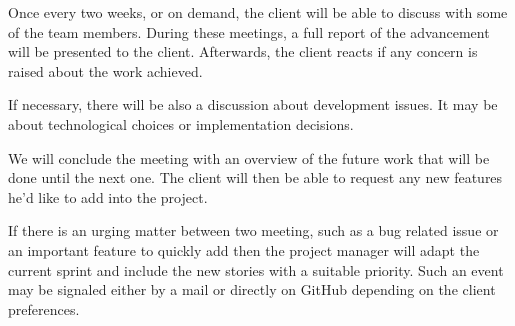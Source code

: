 \documentclass[11pt,a4paper]{article}
\begin{document}
Once every two weeks, or on demand, the client will be able to discuss
with some of the team members. During these meetings, a full report of
the advancement will be presented to the client. Afterwards, the
client reacts if any concern is raised about the work achieved.

If necessary, there will be also a discussion about development
issues. It may be about technological choices or implementation
decisions.

We will conclude the meeting with an overview of the future work that
will be done until the next one. The client will then be able to
request any new features he'd like to add into the project.

If there is an urging matter between two meeting, such as a bug
related issue or an important feature to quickly add then the project
manager will adapt the current sprint and include the new stories with
a suitable priority. Such an event may be signaled either by a mail
or directly on GitHub depending on the client preferences.
\end{document}
